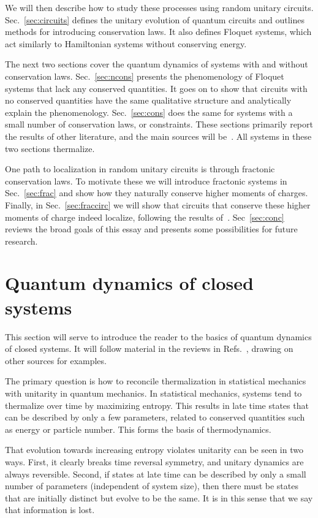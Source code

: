 \documentclass[a4paper,12pt]{article}
\begin{document}
We will then describe how to study these processes using random unitary circuits. Sec.~\ref{sec:circuits} defines the unitary evolution of quantum circuits and outlines methods for introducing conservation laws. It also defines Floquet systems, which act similarly to Hamiltonian systems without conserving energy.

The next two sections cover the quantum dynamics of systems with and without conservation laws. Sec.~\ref{sec:ncons} presents the phenomenology of Floquet systems that lack any conserved quantities. It goes on to show that circuits with no conserved quantities have the same qualitative structure and analytically explain the phenomenology. Sec.~\ref{sec:cons} does the same for systems with a small number of conservation laws, or constraints. These sections primarily report the results of other literature, and the main sources will be~\cite{ChenOtoc, vonKeyserlingkHydro, NahumOpSp, KhemaniOpSp}. All systems in these two sections thermalize. 

One path to localization in random unitary circuits is through fractonic conservation laws. To motivate these we will introduce fractonic systems in Sec.~\ref{sec:frac} and show how they naturally conserve higher moments of charges. Finally, in Sec.~\ref{sec:fraccirc} we will show that circuits that conserve these higher moments of charge indeed localize, following the results of~\cite{PaiFracton}. Sec~\ref{sec:conc} reviews the broad goals of this essay and presents some possibilities for future research.


\section{Quantum dynamics of closed systems} \label{sec:dyn}

This section will serve to introduce the reader to the basics of quantum dynamics of closed systems. It will follow material in the reviews in Refs.~\cite{Cazalilla2010, PolkovnikovClosed, Nandkishore14, GogolinStatMech}, drawing on other sources for examples.

The primary question is how to reconcile thermalization in statistical mechanics with unitarity in quantum mechanics. In statistical mechanics, systems tend to thermalize over time by maximizing entropy. This results in late time states that can be described by only a few parameters, related to conserved quantities such as energy or particle number. This forms the basis of thermodynamics. 

That evolution towards increasing entropy violates unitarity can be seen in two ways. First, it clearly breaks time reversal symmetry, and unitary dynamics are always reversible. Second, if states at late time can be described by only a small number of parameters (independent of system size), then there must be states that are initially distinct but evolve to be the same. It is in this sense that we say that information is lost.
\end{document}
